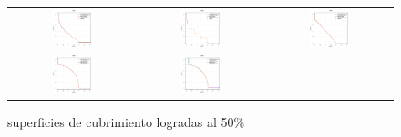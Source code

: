 \begin{figure}[H]
\caption{superficies de cubrimiento logradas al 50\%}%
\begin{tabular}{ccc}
  \includegraphics[width=0.33\textwidth]{Figures_Chapter7/Results_Chapter4/Surface_eps_VSD_MOEA/WFG1.eps}  &
  \includegraphics[width=0.33\textwidth]{Figures_Chapter7/Results_Chapter4/Surface_eps_VSD_MOEA/WFG2.eps} &
  \includegraphics[width=0.33\textwidth]{Figures_Chapter7/Results_Chapter4/Surface_eps_VSD_MOEA/WFG3.eps} \\
  \includegraphics[width=0.33\textwidth]{Figures_Chapter7/Results_Chapter4/Surface_eps_VSD_MOEA/WFG4.eps} &
  \includegraphics[width=0.33\textwidth]{Figures_Chapter7/Results_Chapter4/Surface_eps_VSD_MOEA/WFG5.eps} &

\end{tabular}
\end{figure}
